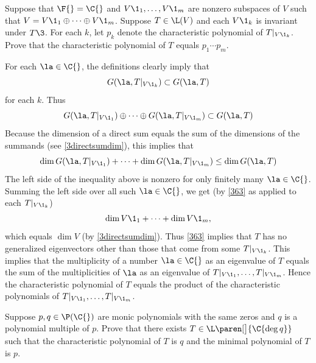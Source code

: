 \exercise
Suppose that $\F{} = \C{}$ and $V\1_1, \dots, V\1_m$ are nonzero subspaces of $V$ such that
$V = V\1_1 \oplus \dots \oplus V\1_m$. Suppose $T \in \L(V)$ and each $V\1_k$ is invariant under $T\3$. For each $k$, let $p_k$ denote the characteristic polynomial of $T|_{V\1_k}$. Prove that
the characteristic polynomial of $T$ equals $p_1 \dotsm p_m$.

\begin{Solution}
For each $\la \in \C{}$, the definitions clearly imply that
\[
G(\la, T|_{V\1_k}) \subset G(\la, T)
\]
for each $k$. Thus
\[
G(\la, T|_{V\1_1}) \oplus \dots \oplus G(\la, T|_{V\1_m}) \subset G(\la, T)
\]
Because the dimension of a direct sum equals the sum of the dimensions of the summands (see \ref{3directsumdim}), this implies that
\[
\dim G(\la, T|_{V\1_1}) + \dots + \dim G(\la, T|_{V\1_m}) \le \dim G(\la, T)
\]
The left side of the inequality above is nonzero for only finitely many $\la \in \C{}$. Summing the left side over all such $\la \in \C{}$, we get (by \ref{363} as applied to each $T|_{V\1_k}$)
\[
\dim V\1_1 + \dots + \dim V\1_m,
\]
which equals $\dim V$ (by \ref{3directsumdim}). Thus \ref{363} implies that $T$ has no generalized eigenvectors other than those that come from some $T|_{V\1_k}$. This implies that the multiplicity of a number $\la \in \C{}$ as an eigenvalue of $T$ equals the sum of the multiplicities of $\la$ as an eigenvalue of $T|_{V\1_1}, \dots, T|_{V\1_m}$. Hence the characteristic polynomial of $T$ equals the product of the characteristic polynomials of $T|_{V\1_1}, \dots, T|_{V\1_m}$.
\end{Solution}

\exercise
Suppose $p, q \in \P(\C{})$ are monic polynomials with the same zeros and $q$ is a polynomial multiple of $p$. Prove that there exists $T \in \L\paren[\big]{\C{\deg q}}$ such that the characteristic polynomial of $T$ is $q$ and the minimal polynomial of $T$ is $p$.

